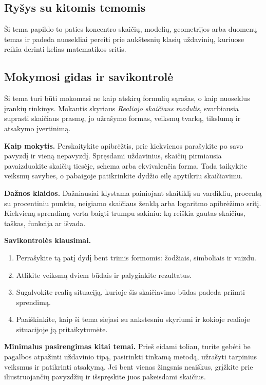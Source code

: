 \subsection{Ryšys su kitomis temomis}
Ši tema papildo to paties koncentro skaičių, modelių, geometrijos arba duomenų temas ir padeda nuosekliai pereiti prie aukštesnių klasių uždavinių, kuriuose reikia derinti kelias matematikos sritis.

\subsection{Mokymosi gidas ir savikontrolė}

Ši tema turi būti mokomasi ne kaip atskirų formulių sąrašas, o kaip nuoseklus įrankių rinkinys. Mokantis skyriaus \textit{Realiojo skaičiaus modulis}, svarbiausia suprasti skaičiaus prasmę, jo užrašymo formas, veiksmų tvarką, tikslumą ir atsakymo įvertinimą.

\textbf{Kaip mokytis.} Perskaitykite apibrėžtis, prie kiekvienos parašykite po savo pavyzdį ir vieną nepavyzdį. Spręsdami uždavinius, skaičių pirmiausia pavaizduokite skaičių tiesėje, schema arba ekvivalenčia forma. Tada taikykite veiksmų savybes, o pabaigoje patikrinkite dydžio eilę apytikriu skaičiavimu.

\textbf{Dažnos klaidos.} Dažniausiai klystama painiojant skaitiklį su vardikliu, procentą su procentiniu punktu, neigiamo skaičiaus ženklą arba logaritmo apibrėžimo sritį. Kiekvieną sprendimą verta baigti trumpu sakiniu: ką reiškia gautas skaičius, taškas, funkcija ar išvada.

\textbf{Savikontrolės klausimai.}
\begin{enumerate}[label=\arabic*.]
\item Perrašykite tą patį dydį bent trimis formomis: žodžiais, simboliais ir vaizdu.
\item Atlikite veiksmą dviem būdais ir palyginkite rezultatus.
\item Sugalvokite realią situaciją, kurioje šis skaičiavimo būdas padeda priimti sprendimą.
\item Paaiškinkite, kaip ši tema siejasi su ankstesniu skyriumi ir kokioje realioje situacijoje ją pritaikytumėte.
\end{enumerate}

\textbf{Minimalus pasirengimas kitai temai.} Prieš eidami toliau, turite gebėti be pagalbos atpažinti uždavinio tipą, pasirinkti tinkamą metodą, užrašyti tarpinius veiksmus ir patikrinti atsakymą. Jei bent vienas žingsnis neaiškus, grįžkite prie iliustruojančių pavyzdžių ir išspręskite juos pakeisdami skaičius.

